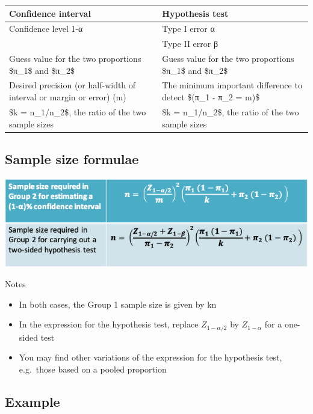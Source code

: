 \documentclass[
]{book}
\providecommand{\tightlist}{%
  \setlength{\itemsep}{0pt}\setlength{\parskip}{0pt}}
\begin{document}
\begin{tabular}{l|l}
\hline
Confidence interval & Hypothesis test\\
\hline
Confidence level 1-α & Type I error α\\
\hline
 & Type II error β\\
\hline
Guess value for the two proportions \$π\_1\$ and \$π\_2\$ & Guess value for the two proportions \$π\_1\$ and \$π\_2\$\\
\hline
Desired precision (or half-width of interval or margin or error) (m) & The minimum important difference to detect \$(π\_1 - π\_2 = m)\$\\
\hline
\$k = n\_1/n\_2\$, the ratio of the two sample sizes & \$k = n\_1/n\_2\$, the ratio of the two sample sizes\\
\hline
\end{tabular}

\hypertarget{sample-size-formulae}{%
\subsection{Sample size formulae}\label{sample-size-formulae}}

\includegraphics[width=1\linewidth]{./7_65}

Notes

\begin{itemize}
\tightlist
\item
  In both cases, the Group 1 sample size is given by kn
\item
  In the expression for the hypothesis test, replace \(Z_{1-α/2}\) by \(Z_{1-α}\) for a one-sided test
\item
  You may find other variations of the expression for the hypothesis test, e.g.~those based on a pooled proportion
\end{itemize}

\hypertarget{example-6}{%
\subsection{Example}\label{example-6}}
\end{document}
